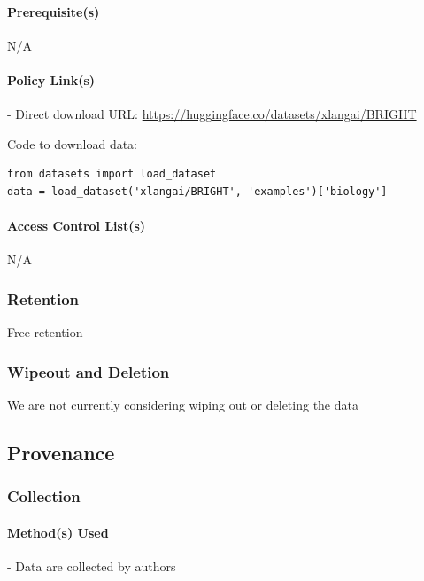 \paragraph{Prerequisite(s)}
N/A

\paragraph{Policy Link(s)}
- Direct download URL: \url{https://huggingface.co/datasets/xlangai/BRIGHT}

Code to download data:
\begin{verbatim}
from datasets import load_dataset
data = load_dataset('xlangai/BRIGHT', 'examples')['biology']
\end{verbatim}

\paragraph{Access Control List(s)}
N/A

\subsubsection{Retention}
Free retention

\subsubsection{Wipeout and Deletion}
We are not currently considering wiping out or deleting the data

\subsection{Provenance}
\subsubsection{Collection}
\paragraph{Method(s) Used}
- Data are collected by authors

